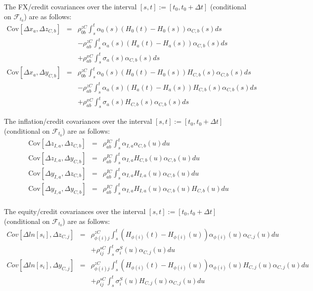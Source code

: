 \documentclass[12pt, a4paper]{article}
\begin{document}
{{\begin{appendix}
The FX/credit covariances over the interval $[s,t] := [t_0, t_0+\Delta t]$ (conditional on $\mathcal{F}_{t_0}$) are as follows:
\begin{eqnarray*}
  \mathrm{Cov}[ \Delta x_a, \Delta z_{C,b} ] & = & \rho_{0b}^{zC} \int_s^t \alpha_0(s) (H_0(t)-H_0(s)) \alpha_{C,b}(s) ds \\
                                             & & -\rho_{ab}^{zC} \int_s^t \alpha_a(s)(H_a(t)-H_a(s))\alpha_{C,b}(s) ds \\
                                             & & +\rho_{ab}^{xC}\int_s^t \sigma_a(s) \alpha_{C,b}(s) ds \\
  \mathrm{Cov}[ \Delta x_a, \Delta y_{C,b} ] & = & \rho_{0b}^{zC} \int_s^t \alpha_0(s) (H_0(t)-H_0(s)) H_{C,b}(s)\alpha_{C,b}(s) ds \\
                                             & & -\rho_{ab}^{zC} \int_s^t \alpha_a(s)(H_a(t)-H_a(s))H_{C,b}(s)\alpha_{C,b}(s) ds \\
                                             & & +\rho_{ab}^{xC}\int_s^t \sigma_a(s) H_{C,b}(s)\alpha_{C,b}(s) ds
\end{eqnarray*}

The inflation/credit covariances over the interval $[s,t] := [t_0, t_0+\Delta t]$ (conditional on $\mathcal{F}_{t_0}$) are as follows:
\begin{eqnarray*}
  \mathrm{Cov}[ \Delta z_{I,a}, \Delta z_{C,b} ] &=&
  \rho_{ab}^{IC}\int_s^t \alpha_{I,a} \alpha_{C,b}(u) du\\
  \mathrm{Cov}[ \Delta z_{I,a}, \Delta y_{C,b} ] &=&
  \rho_{ab}^{IC}\int_s^t \alpha_{I,a} H_{C,b}(u) \alpha_{C,b}(u) du\\
  \mathrm{Cov}[ \Delta y_{I,a}, \Delta z_{C,b} ] &=&
  \rho_{ab}^{IC}\int_s^t \alpha_{I,a} H_{I,a}(u) \alpha_{C,b}(u) du\\
  \mathrm{Cov}[ \Delta y_{I,a}, \Delta y_{C,b} ] &=&
  \rho_{ab}^{IC}\int_s^t \alpha_{I,a} H_{I,a}(u) \alpha_{C,b}(u) H_{C,b}(u) du\\
\end{eqnarray*}

The equity/credit covariances over the interval $[s,t] := [t_0, t_0+\Delta t]$ (conditional on $\mathcal{F}_{t_0}$) are as follows:
\begin{eqnarray*}
	Cov \left[\Delta ln[s_i], \Delta z_{C,j} \right] &=&
	\rho_{\phi(i)j}^{zC} \int_s^t (H_{\phi(i)} (t) - H_{\phi(i)} (u)) \alpha_{\phi(i)} (u) \alpha_{C,j} (u) du\\
	&&+ \rho_{ij}^{sC} \int_s^t \sigma_i^S (u) \alpha_{C,j} (u) du\\	
	Cov \left[\Delta ln[s_i], \Delta y_{C,j} \right] &=&
	\rho_{\phi(i)j}^{zC} \int_s^t (H_{\phi(i)} (t) - H_{\phi(i)} (u)) \alpha_{\phi(i)} (u) H_{C,j} (u) \alpha_{C,j} (u) du\\
	&&+ \rho_{ij}^{sC} \int_s^t \sigma_i^S (u) H_{C,j} (u) \alpha_{C,j} (u) du\\
\end{eqnarray*}


\end{appendix}}}
\end{document}
